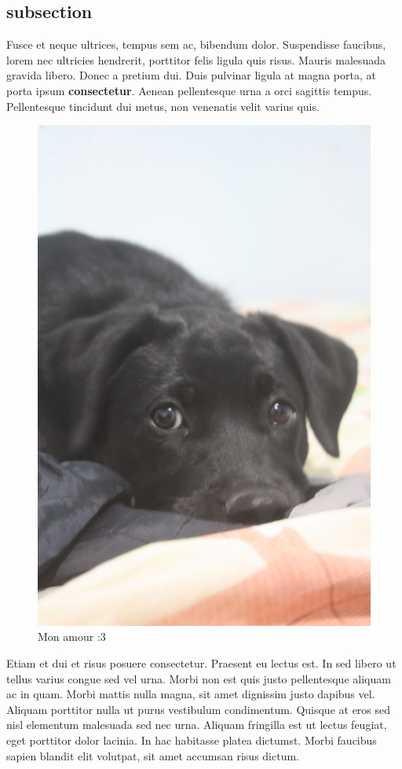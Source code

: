 \documentclass[12pt,letterpaper,oneside]{book}
\begin{document}
\subsection{subsection}
\noindent Fusce et neque ultrices, tempus sem ac, bibendum dolor. Suspendisse faucibus, lorem nec ultricies hendrerit, porttitor felis ligula quis risus. Mauris malesuada gravida libero. Donec a pretium dui. Duis pulvinar ligula at magna porta, at porta ipsum \textbf{consectetur}. Aenean pellentesque urna a orci sagittis tempus. Pellentesque tincidunt dui metus, non venenatis velit varius quis.

\begin{figure}[h]
\centering
\includegraphics[scale=.06]{img/milla.jpg}
\caption{Mon amour :3}
\end{figure}
 Etiam et dui et risus posuere consectetur. Praesent eu lectus est. In sed libero ut tellus varius congue sed vel urna. Morbi non est quis justo pellentesque aliquam ac in quam. Morbi mattis nulla magna, sit amet dignissim justo dapibus vel. Aliquam porttitor nulla ut purus vestibulum condimentum. Quisque at eros sed nisl elementum malesuada sed nec urna. Aliquam fringilla est ut lectus feugiat, eget porttitor dolor lacinia. In hac habitasse platea dictumst. Morbi faucibus sapien blandit elit volutpat, sit amet accumsan risus dictum.
\end{document}
